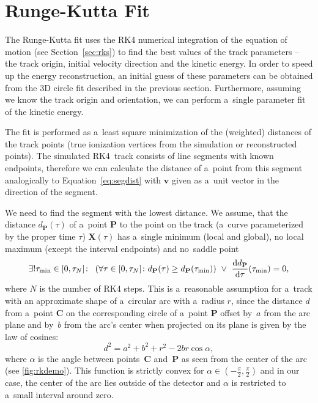 	\section{Runge-Kutta Fit}
	\label{sec:rkfit}
		The Runge-Kutta fit uses the \acf{RK4} numerical integration of the equation of motion (see Section~\ref{sec:rks}) to find the best values of the track parameters -- the track origin, initial velocity direction and the kinetic energy. In order to speed up the energy reconstruction, an initial guess of these parameters can be obtained from the 3D circle fit described in the previous section. Furthermore, assuming we know the track origin and orientation, we can perform a~single parameter fit of the kinetic energy.
		
		The fit is performed as a~least square minimization of the (weighted) distances of the track points (true ionization vertices from the simulation or reconstructed points). The simulated \ac{RK4}~track consists of line segments with known endpoints, therefore we can calculate the distance of a~point from this segment analogically to Equation~\ref{eq:segdist} with $\mathbf{v}$ given as a~unit vector in the direction of the segment.
		
		We need to find the segment with the lowest distance. We assume, that the distance $d_\mathbf{P}(\tau)$ of a~point $\mathbf{P}$ to the point on the track (a~curve parameterized by the proper time $\tau$) $\mathbf{X}(\tau)$ has a~single minimum (local and global), no local maximum (except the interval endpoints) and no~saddle point
			\begin{equation}
				\label{eq:rk_assum}
				\exists!\tau_\text{min}\in[0,\tau_N]\colon\ \left(\forall\tau\in[0,\tau_N]\colon  d_{\mathbf{P}}(\tau) \geq d_{\mathbf{P}}(\tau_\text{min})\right)\ \lor\ \dv{d_{\mathbf{P}}}{\tau}{(\tau_\text{min})} = 0,
			\end{equation}
		where $N$ is the number of \ac{RK4} steps. This is a~reasonable assumption for a~track with an approximate shape of a~circular arc with a~radius $r$, since the distance $d$ from a~point $\mathbf{C}$ on the corresponding circle of a~point $\mathbf{P}$ offset by~$a$ from the arc plane and by~$b$ from the arc's center when projected on its plane is given by the law of cosines:
			\begin{equation}
				\label{eq:rkdemo}
				d^2 = a^2+b^2+r^2 - 2br\cos\alpha,
			\end{equation}
		where $\alpha$ is the angle between points~$\mathbf{C}$ and~$\mathbf{P}$ as seen from the center of the arc (see \cref{fig:rkdemo}). This function is strictly convex for $\alpha\in\left(-\frac{\pi}{2},\frac{\pi}{2}\right)$ and in our case, the center of the arc lies outside of the detector and $\alpha$ is restricted to a~small interval around zero.
		
